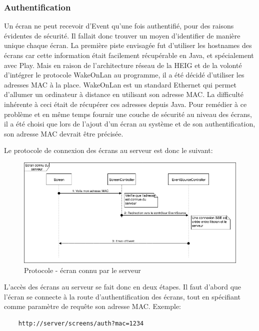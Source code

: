 \documentclass[french]{article}
\begin{document}
\subsubsection{Authentification}
Un écran ne peut recevoir d'Event qu'une fois authentifié, pour des raisons évidentes de sécurité. Il fallait donc trouver un moyen d'identifier de manière unique chaque écran. La première piste envisagée fut d'utiliser les hostnames des écrans car cette information était facilement récupérable en Java, et spécialement avec Play. Mais en raison de l'architecture réseau de la HEIG et de la volonté d'intégrer le protocole WakeOnLan au programme, il a été décidé d'utiliser les adresses MAC à la place. WakeOnLan est un standard Ethernet qui permet d'allumer un ordinateur à distance en utilisant son adresse MAC.\newline 
La difficulté inhérente à ceci était de récupérer ces adresses depuis Java. Pour remédier à ce problème et en même temps fournir une couche de sécurité au niveau des écrans, il a été choisi que lors de l'ajout d'un écran au système et de son authentification, son adresse MAC devrait être précisée. \newline

Le protocole de connexion des écrans au serveur est donc le suivant:

	\begin{figure}[h]
		\centering	
		\includegraphics[scale=0.5]{schemas/screen_protocol.png}
		\caption{Protocole - écran connu par le serveur}
	\end{figure}

L'accès des écrans au serveur se fait donc en deux étapes. Il faut d'abord que l'écran se connecte à la route d'authentification des écrans, tout en spécifiant 
comme paramètre de requête son adresse MAC. Exemple:
\begin{verbatim}
	http://server/screens/auth?mac=1234
\end{verbatim}
\end{document}
